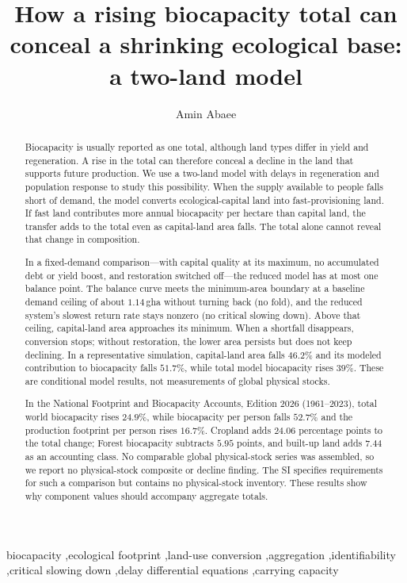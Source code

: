 \documentclass[preprint,12pt,authoryear]{elsarticle}
\begin{document}
\begin{frontmatter}

\title{How a rising biocapacity total can conceal a shrinking ecological base: a two-land model}

\author[1]{Amin Abaee}

\begin{abstract}
\footnotesize
Biocapacity is usually reported as one total, although land types differ in yield and regeneration. A rise in the total can therefore conceal a decline in the land that supports future production. We use a two-land model with delays in regeneration and population response to study this possibility. When the supply available to people falls short of demand, the model converts ecological-capital land into fast-provisioning land. If fast land contributes more annual biocapacity per hectare than capital land, the transfer adds to the total even as capital-land area falls. The total alone cannot reveal that change in composition.

In a fixed-demand comparison—with capital quality at its maximum, no accumulated debt or yield boost, and restoration switched off—the reduced model has at most one balance point. The balance curve meets the minimum-area boundary at a baseline demand ceiling of about $1.14$\,gha without turning back (no fold), and the reduced system's slowest return rate stays nonzero (no critical slowing down). Above that ceiling, capital-land area approaches its minimum. When a shortfall disappears, conversion stops; without restoration, the lower area persists but does not keep declining. In a representative simulation, capital-land area falls $46.2\%$ and its modeled contribution to biocapacity falls $51.7\%$, while total model biocapacity rises $39\%$. These are conditional model results, not measurements of global physical stocks.

In the National Footprint and Biocapacity Accounts, Edition 2026 (1961--2023), total world biocapacity rises $24.9\%$, while biocapacity per person falls $52.7\%$ and the production footprint per person rises $16.7\%$. Cropland adds $24.06$ percentage points to the total change; Forest biocapacity subtracts $5.95$ points, and built-up land adds $7.44$ as an accounting class. No comparable global physical-stock series was assembled, so we report no physical-stock composite or decline finding. The SI specifies requirements for such a comparison but contains no physical-stock inventory. These results show why component values should accompany aggregate totals.
\end{abstract}

\begin{keyword}
\footnotesize
biocapacity \sep ecological footprint \sep land-use conversion \sep aggregation \sep identifiability \sep critical slowing down \sep delay differential equations \sep carrying capacity
\end{keyword}

\end{frontmatter}
\end{document}
